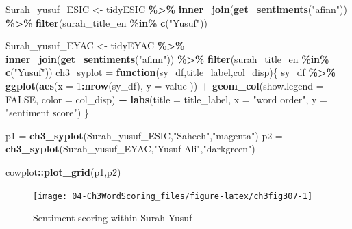 \documentclass[
]{article}
\newenvironment{Shaded}{\begin{snugshade}}{\end{snugshade}}
\newcommand{\AttributeTok}[1]{\textcolor[rgb]{0.13,0.29,0.53}{#1}}
\newcommand{\ConstantTok}[1]{\textcolor[rgb]{0.56,0.35,0.01}{#1}}
\newcommand{\ControlFlowTok}[1]{\textcolor[rgb]{0.13,0.29,0.53}{\textbf{#1}}}
\newcommand{\DecValTok}[1]{\textcolor[rgb]{0.00,0.00,0.81}{#1}}
\newcommand{\FunctionTok}[1]{\textcolor[rgb]{0.13,0.29,0.53}{\textbf{#1}}}
\newcommand{\NormalTok}[1]{#1}
\newcommand{\OtherTok}[1]{\textcolor[rgb]{0.56,0.35,0.01}{#1}}
\newcommand{\SpecialCharTok}[1]{\textcolor[rgb]{0.81,0.36,0.00}{\textbf{#1}}}
\newcommand{\StringTok}[1]{\textcolor[rgb]{0.31,0.60,0.02}{#1}}
\begin{document}
\begin{Shaded}
\begin{Highlighting}[]
\NormalTok{Surah\_yusuf\_ESIC }\OtherTok{\textless{}{-}}\NormalTok{ tidyESIC }\SpecialCharTok{\%\textgreater{}\%}
  \FunctionTok{inner\_join}\NormalTok{(}\FunctionTok{get\_sentiments}\NormalTok{(}\StringTok{"afinn"}\NormalTok{)) }\SpecialCharTok{\%\textgreater{}\%}
  \FunctionTok{filter}\NormalTok{(surah\_title\_en }\SpecialCharTok{\%in\%} \FunctionTok{c}\NormalTok{(}\StringTok{"Yusuf"}\NormalTok{))}

\NormalTok{Surah\_yusuf\_EYAC }\OtherTok{\textless{}{-}}\NormalTok{ tidyEYAC }\SpecialCharTok{\%\textgreater{}\%}
  \FunctionTok{inner\_join}\NormalTok{(}\FunctionTok{get\_sentiments}\NormalTok{(}\StringTok{"afinn"}\NormalTok{)) }\SpecialCharTok{\%\textgreater{}\%}
  \FunctionTok{filter}\NormalTok{(surah\_title\_en }\SpecialCharTok{\%in\%} \FunctionTok{c}\NormalTok{(}\StringTok{"Yusuf"}\NormalTok{))}
\NormalTok{ch3\_syplot }\OtherTok{=} \ControlFlowTok{function}\NormalTok{(sy\_df,title\_label,col\_disp)\{}
\NormalTok{  sy\_df }\SpecialCharTok{\%\textgreater{}\%} 
        \FunctionTok{ggplot}\NormalTok{(}\FunctionTok{aes}\NormalTok{(}\AttributeTok{x =} \DecValTok{1}\SpecialCharTok{:}\FunctionTok{nrow}\NormalTok{(sy\_df), }\AttributeTok{y =}\NormalTok{ value )) }\SpecialCharTok{+}
          \FunctionTok{geom\_col}\NormalTok{(}\AttributeTok{show.legend =} \ConstantTok{FALSE}\NormalTok{, }\AttributeTok{color =}\NormalTok{ col\_disp) }\SpecialCharTok{+}
          \FunctionTok{labs}\NormalTok{(}\AttributeTok{title =}\NormalTok{ title\_label, }
               \AttributeTok{x =} \StringTok{"word order"}\NormalTok{,}
               \AttributeTok{y =} \StringTok{"sentiment score"}\NormalTok{)}
\NormalTok{\}}

\NormalTok{p1 }\OtherTok{=} \FunctionTok{ch3\_syplot}\NormalTok{(Surah\_yusuf\_ESIC,}\StringTok{"Saheeh"}\NormalTok{,}\StringTok{"magenta"}\NormalTok{)}
\NormalTok{p2 }\OtherTok{=} \FunctionTok{ch3\_syplot}\NormalTok{(Surah\_yusuf\_EYAC,}\StringTok{"Yusuf Ali"}\NormalTok{,}\StringTok{"darkgreen"}\NormalTok{)}

\NormalTok{cowplot}\SpecialCharTok{::}\FunctionTok{plot\_grid}\NormalTok{(p1,p2)}
\end{Highlighting}
\end{Shaded}

\begin{figure}

{\centering \texttt{[image: 04-Ch3WordScoring\_files/figure-latex/ch3fig307-1]} 

}

\caption{Sentiment scoring within Surah Yusuf}\label{fig:ch3fig307}
\end{figure}
\end{document}
